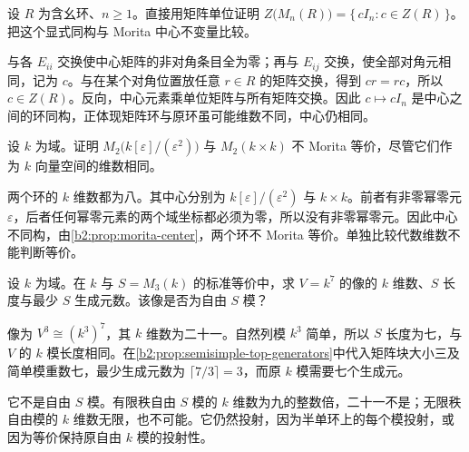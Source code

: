 \begin{exercise}\label{b2:ex:16-matrix-center}
	设 \(R\) 为含幺环、\(n\ge1\)。直接用矩阵单位证明 \(Z\bigl(M_n(R)\bigr)=\bigl\{\,cI_n:c\in Z(R)\,\bigr\}\)。把这个显式同构与 Morita 中心不变量比较。
\end{exercise}
\begin{solution}
	与各 \(E_{ii}\) 交换使中心矩阵的非对角条目全为零；再与 \(E_{ij}\) 交换，使全部对角元相同，记为 \(c\)。与在某个对角位置放任意 \(r\in R\) 的矩阵交换，得到 \(cr=rc\)，所以 \(c\in Z(R)\)。反向，中心元素乘单位矩阵与所有矩阵交换。因此 \(c\mapsto cI_n\) 是中心之间的环同构，正体现矩阵环与原环虽可能维数不同，中心仍相同。
\end{solution}

\begin{exercise}\label{b2:ex:16-center-obstruction}
	设 \(k\) 为域。证明 \(M_2\bigl(k[\varepsilon]/(\varepsilon^2)\bigr)\) 与 \(M_2(k\times k)\) 不 Morita 等价，尽管它们作为 \(k\) 向量空间的维数相同。
\end{exercise}
\begin{solution}
	两个环的 \(k\) 维数都为八。其中心分别为 \(k[\varepsilon]/(\varepsilon^2)\) 与 \(k\times k\)。前者有非零幂零元 \(\varepsilon\)，后者任何幂零元素的两个域坐标都必须为零，所以没有非零幂零元。因此中心不同构，由\cref{b2:prop:morita-center}，两个环不 Morita 等价。单独比较代数维数不能判断等价。
\end{solution}

\begin{exercise}\label{b2:ex:16-dimension-length-generators}
	设 \(k\) 为域。在 \(k\) 与 \(S=M_3(k)\) 的标准等价中，求 \(V=k^7\) 的像的 \(k\) 维数、\(S\) 长度与最少 \(S\) 生成元数。该像是否为自由 \(S\) 模？
\end{exercise}
\begin{solution}
	像为 \(V^3\cong(k^3)^7\)，其 \(k\) 维数为二十一。自然列模 \(k^3\) 简单，所以 \(S\) 长度为七，与 \(V\) 的 \(k\) 模长度相同。在\cref{b2:prop:semisimple-top-generators}中代入矩阵块大小三及简单模重数七，最少生成元数为 \(\lceil7/3\rceil=3\)，而原 \(k\) 模需要七个生成元。

	它不是自由 \(S\) 模。有限秩自由 \(S\) 模的 \(k\) 维数为九的整数倍，二十一不是；无限秩自由模的 \(k\) 维数无限，也不可能。它仍然投射，因为半单环上的每个模投射，或因为等价保持原自由 \(k\) 模的投射性。
\end{solution}

